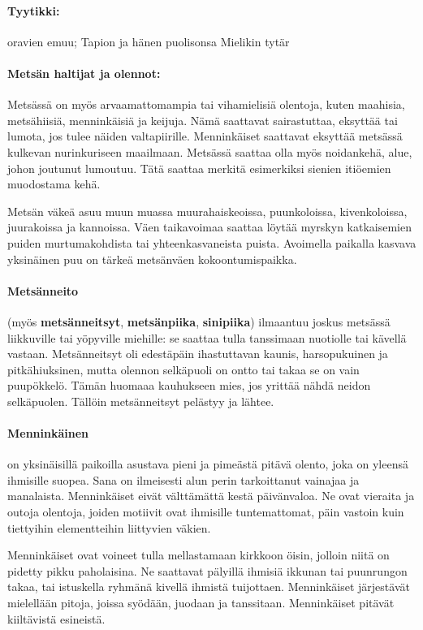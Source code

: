   \paragraph{Tyytikki:} oravien emuu; Tapion ja hänen puolisonsa Mielikin tytär
  \paragraph{Metsän haltijat ja olennot:} Metsässä on myös arvaamattomampia tai vihamielisiä
    olentoja, kuten maahisia, metsähiisiä, menninkäisiä ja keijuja. Nämä saattavat sairastuttaa,
    eksyttää tai lumota, jos tulee näiden valtapiirille. Menninkäiset saattavat eksyttää metsässä
    kulkevan nurinkuriseen maailmaan. Metsässä saattaa olla myös noidankehä, alue, johon joutunut
    lumoutuu. Tätä saattaa merkitä esimerkiksi sienien itiöemien muodostama kehä.
    \par
    Metsän väkeä asuu muun muassa muurahaiskeoissa, puunkoloissa, kivenkoloissa, juurakoissa ja
    kannoissa. Väen taikavoimaa saattaa löytää myrskyn katkaisemien puiden murtumakohdista tai
    yhteenkasvaneista puista. Avoimella paikalla kasvava yksinäinen puu on tärkeä metsänväen
    kokoontumispaikka.
  \paragraph{Metsänneito} (myös \textbf{metsänneitsyt}, \textbf{metsänpiika}, \textbf{sinipiika})
    ilmaantuu joskus metsässä liikkuville tai yöpyville miehille: se saattaa tulla tanssimaan
    nuotiolle tai kävellä vastaan. Metsänneitsyt oli edestäpäin ihastuttavan kaunis, harsopukuinen
    ja pitkähiuksinen, mutta olennon selkäpuoli on ontto tai takaa se on vain puupökkelö. Tämän
    huomaaa kauhukseen mies, jos yrittää nähdä neidon selkäpuolen. Tällöin metsänneitsyt pelästyy
    ja lähtee.
  \paragraph{Menninkäinen} on yksinäisillä paikoilla asustava pieni ja pimeästä pitävä olento, joka
    on yleensä ihmisille suopea. Sana on ilmeisesti alun perin tarkoittanut vainajaa ja manalaista.
    Menninkäiset eivät välttämättä kestä päivänvaloa. Ne ovat vieraita ja outoja olentoja, joiden
    motiivit ovat ihmisille tuntemattomat, päin vastoin kuin tiettyihin elementteihin liittyvien
    väkien.
    \par
    Menninkäiset ovat voineet tulla mellastamaan kirkkoon öisin, jolloin niitä on pidetty pikku
    paholaisina. Ne saattavat pälyillä ihmisiä ikkunan tai puunrungon takaa, tai istuskella ryhmänä
    kivellä ihmistä tuijottaen. Menninkäiset järjestävät mielellään pitoja, joissa syödään, juodaan
    ja tanssitaan. Menninkäiset pitävät kiiltävistä esineistä.
